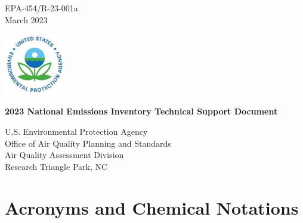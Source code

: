 \documentclass[
  11pt,
  oneside]{book}
\author{}
\date{\vspace{-2.5em}}
\begin{document}
\thispagestyle{empty}

\begin{flushright}
EPA-454/R-23-001a \\
March 2023
\end{flushright}

\includegraphics[width=0.20\textwidth]{figures/epa-logo.jpg}

\begin{center}
\textbf{\Large{2023 National Emissions Inventory Technical Support Document}}
\end{center}

\vspace{0.60\textheight}

\begin{center}
U.S. Environmental Protection Agency \\
Office of Air Quality Planning and Standards \\
Air Quality Assessment Division \\
Research Triangle Park, NC
\end{center}


{
\hypersetup{linkcolor=}
\setcounter{tocdepth}{1}
\tableofcontents
}
\listoffigures
\listoftables
\chapter*{Acronyms and Chemical Notations}\label{acronyms-and-chemical-notations}
\end{document}
